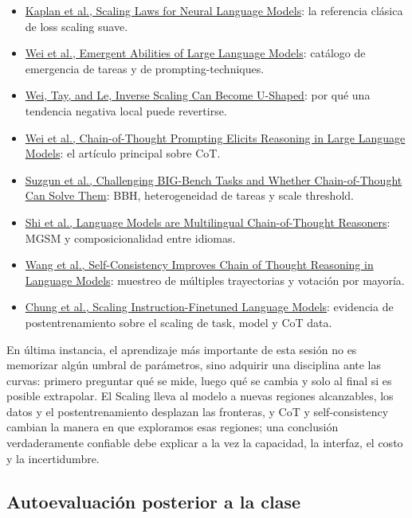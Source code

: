 \begin{itemize}
  \item \href{https://arxiv.org/abs/2001.08361}{Kaplan et al., Scaling Laws for Neural Language Models}: la referencia clásica de loss scaling suave.
  \item \href{https://arxiv.org/abs/2206.07682}{Wei et al., Emergent Abilities of Large Language Models}: catálogo de emergencia de tareas y de prompting-techniques.
  \item \href{https://arxiv.org/abs/2211.02011}{Wei, Tay, and Le, Inverse Scaling Can Become U-Shaped}: por qué una tendencia negativa local puede revertirse.
  \item \href{https://arxiv.org/abs/2201.11903}{Wei et al., Chain-of-Thought Prompting Elicits Reasoning in Large Language Models}: el artículo principal sobre CoT.
  \item \href{https://arxiv.org/abs/2210.09261}{Suzgun et al., Challenging BIG-Bench Tasks and Whether Chain-of-Thought Can Solve Them}: BBH, heterogeneidad de tareas y scale threshold.
  \item \href{https://arxiv.org/abs/2210.03057}{Shi et al., Language Models are Multilingual Chain-of-Thought Reasoners}: MGSM y composicionalidad entre idiomas.
  \item \href{https://arxiv.org/abs/2203.11171}{Wang et al., Self-Consistency Improves Chain of Thought Reasoning in Language Models}: muestreo de múltiples trayectorias y votación por mayoría.
  \item \href{https://arxiv.org/abs/2210.11416}{Chung et al., Scaling Instruction-Finetuned Language Models}: evidencia de postentrenamiento sobre el scaling de task, model y CoT data.
\end{itemize}

En última instancia, el aprendizaje más importante de esta sesión no es memorizar algún umbral de parámetros, sino adquirir una disciplina ante las curvas: primero preguntar qué se mide, luego qué se cambia y solo al final si es posible extrapolar. El Scaling lleva al modelo a nuevas regiones alcanzables, los datos y el postentrenamiento desplazan las fronteras, y CoT y self-consistency cambian la manera en que exploramos esas regiones; una conclusión verdaderamente confiable debe explicar a la vez la capacidad, la interfaz, el costo y la incertidumbre.

\subsection{Autoevaluación posterior a la clase}

